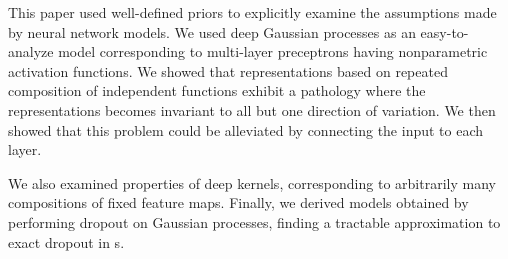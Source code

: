 \documentclass{article} %
\begin{document}
This paper used well-defined priors to explicitly examine the assumptions made by neural network models.
%
We used deep Gaussian processes as an easy-to-analyze model corresponding to multi-layer preceptrons having nonparametric activation functions.
%
We showed that representations based on repeated composition of independent functions exhibit a pathology where the representations becomes invariant to all but one direction of variation. %
We then showed that this problem could be alleviated by connecting the input to each layer.

We also examined properties of deep kernels, corresponding to arbitrarily many compositions of fixed feature maps.
Finally, we derived models obtained by performing dropout on Gaussian processes, finding a tractable approximation to exact dropout in \gp{}s.
\end{document}
